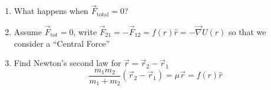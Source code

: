\documentclass{letter}
\begin{document}
\begin{enumerate}
\item What happens when $\vec{F}_{\text{total}}=0$?
\item Assume $\vec{F}_{\text{tot}}=0$, write
  $\vec{F}_{21}=-\vec{F}_{12}=f(r)\hat{r} = -\vec{\nabla}U(r)$ so that we
  consider a ``Central Force''
  
\item Find Newton's second law for $\vec{r}=\vec{r}_2-\vec{r}_1$
  \begin{equation}
    \frac{m_1m_2}{m_1+m_2}(\vec{r}_2-\vec{r}_1) = \mu\vec{r} = f(r)\hat{r}
  \end{equation}
  
  
\end{enumerate}
\end{document}
